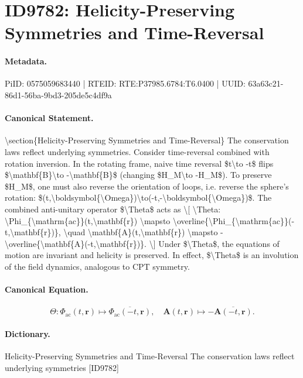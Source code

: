 \section*{ID9782: Helicity-Preserving Symmetries and Time-Reversal}
\paragraph{Metadata.}
PiID: 0575059683440 | RTEID: RTE:P37985.6784:T6.0400 | UUID: 63a63c21-86d1-56ba-9bd3-205de5c4df9a

\paragraph{Canonical Statement.}
\textbackslash{}section\{Helicity-Preserving Symmetries and Time-Reversal\} The conservation laws reflect underlying symmetries. Consider time-reversal combined with rotation inversion. In the rotating frame, naive time reversal \$t\textbackslash{}to -t\$ flips \$\textbackslash{}mathbf\{B\}\textbackslash{}to -\textbackslash{}mathbf\{B\}\$ (changing \$H\_M\textbackslash{}to -H\_M\$). To preserve \$H\_M\$, one must also reverse the orientation of loops, i.e. reverse the sphere's rotation: \$(t,\textbackslash{}boldsymbol\{\textbackslash{}Omega\})\textbackslash{}to(-t,-\textbackslash{}boldsymbol\{\textbackslash{}Omega\})\$. The combined anti-unitary operator \$\textbackslash{}Theta\$ acts as \textbackslash{}[ \textbackslash{}Theta: \textbackslash{}Phi\_\{\textbackslash{}mathrm\{ac\}\}(t,\textbackslash{}mathbf\{r\}) \textbackslash{}mapsto \textbackslash{}overline\{\textbackslash{}Phi\_\{\textbackslash{}mathrm\{ac\}\}(-t,\textbackslash{}mathbf\{r\})\}, \textbackslash{}quad \textbackslash{}mathbf\{A\}(t,\textbackslash{}mathbf\{r\}) \textbackslash{}mapsto -\textbackslash{}overline\{\textbackslash{}mathbf\{A\}(-t,\textbackslash{}mathbf\{r\})\}. \textbackslash{}] Under \$\textbackslash{}Theta\$, the equations of motion are invariant and helicity is preserved. In effect, \$\textbackslash{}Theta\$ is an involution of the field dynamics, analogous to CPT symmetry.

\paragraph{Canonical Equation.}
\[
\Theta: \Phi_{\mathrm{ac}}(t,\mathbf{r}) \mapsto \overline{\Phi_{\mathrm{ac}}(-t,\mathbf{r})}, \quad \mathbf{A}(t,\mathbf{r}) \mapsto -\overline{\mathbf{A}(-t,\mathbf{r})}.
\]

\paragraph{Dictionary.}
Helicity-Preserving Symmetries and Time-Reversal The conservation laws reflect underlying symmetries [ID9782]

